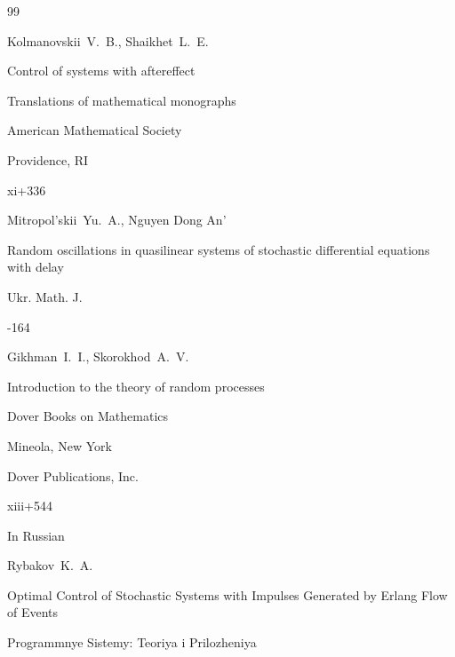 \begin{thebibliography}{99}

\by Kolmanovskii~V.~B., Shaikhet~L.~E.

\book Control of systems with aftereffect

\serial Translations of mathematical monographs


\publ American Mathematical Society

\publaddr Providence, RI


\totalpages xi+336 








\by Mitropol'skii~Yu.~A., Nguyen Dong An'

\paper Random oscillations in quasilinear systems of stochastic differential equations with delay

\jour Ukr. Math. J. 



-164 








\by Gikhman~I.~I., Skorokhod~A.~V.

\book Introduction to the theory of random processes


\serial Dover Books on Mathematics

\publaddr Mineola, New York

\publaddr Dover Publications, Inc.

\totalpages xiii+544








\lang In Russian

\by Rybakov~K.~A.

\paper Optimal Control of Stochastic Systems with Impulses Generated by Erlang Flow of Events

\jour Programmnye Sistemy: Teoriya i Prilozheniya


\end{thebibliography}
